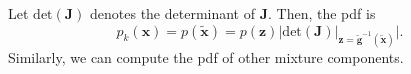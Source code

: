 Let $\mathrm{det}(\bm{J})$ denotes the determinant of $\bm{J}$. Then, the pdf is
\begin{equation}\label{eq:sufficient-change-var}
  p_k(\bm{x}) = p(\tilde{\bm{x}}) =  p(\bm{z}) \bigg| \mathrm{det}(\bm{J}) \big|_{\bm{z}=\tilde{\bm{g}}^{-1}(\tilde{\bm{x}})}\bigg|.
\end{equation}
Similarly, we can compute the pdf of other mixture components.

